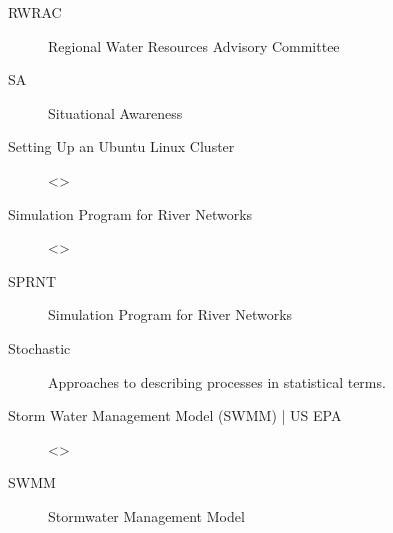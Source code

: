 \documentclass[letterpaper,12pt,english]{book}
\begin{document}
\begin{description}
\item[{RWRAC\label{\detokenize{glossary:term-RWRAC}}}] \leavevmode
\sphinxAtStartPar
Regional Water Resources Advisory Committee

\item[{SA\label{\detokenize{glossary:term-SA}}}] \leavevmode
\sphinxAtStartPar
Situational Awareness

\item[{Setting Up an Ubuntu Linux Cluster\label{\detokenize{glossary:term-Setting-Up-an-Ubuntu-Linux-Cluster}}}] \leavevmode
\sphinxAtStartPar
\textless{}\textgreater{}

\item[{Simulation Program for River Networks\label{\detokenize{glossary:term-Simulation-Program-for-River-Networks}}}] \leavevmode
\sphinxAtStartPar
\textless{}\textgreater{}

\item[{SPRNT\label{\detokenize{glossary:term-SPRNT}}}] \leavevmode
\sphinxAtStartPar
Simulation Program for River Networks

\item[{Stochastic\label{\detokenize{glossary:term-Stochastic}}}] \leavevmode
\sphinxAtStartPar
Approaches to describing processes in statistical terms.

\item[{Storm Water Management Model (SWMM) | US EPA\label{\detokenize{glossary:term-Storm-Water-Management-Model-SWMM-US-EPA}}}] \leavevmode
\sphinxAtStartPar
\textless{}\textgreater{}

\item[{SWMM\label{\detokenize{glossary:term-SWMM}}}] \leavevmode
\sphinxAtStartPar
Stormwater Management Model


\end{description}
\end{document}
